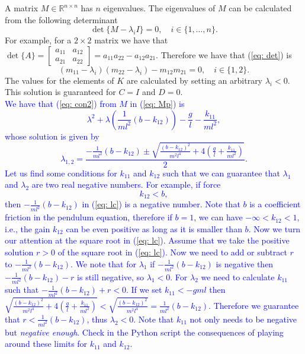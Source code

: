 A matrix $M\in\mathbb{R}^{n\times n}$ has $n$ eigenvalues. The eigenvalues of $M$ can be calculated from the following determinant
\begin{equation}
	\operatorname{det}\{M - \lambda_{i} I\} = 0, \quad i\in\{1,\dots,n\}. \label{eq: det}
\end{equation}
For example, for a $2 \times 2$ matrix we have that $\operatorname{det}\{A\} = \begin{bmatrix}a_{11} & a_{12} \\ a_{21} & a_{22}\end{bmatrix} = a_{11}a_{22} - a_{12}a_{21}$. Therefore we have that (\ref{eq: det}) is
\begin{equation}
	(m_{11} - \lambda_i) (m_{22} - \lambda_i) - m_{12}m_{21} = 0, \quad  i\in\{1,2\}. \label{eq: con2}
\end{equation}
The values for the elements of $K$ are calculated by setting an arbitrary $\lambda_i < 0$. This solution is guaranteed for $C = I$ and $D = 0$. \\
\textcolor{blue}{
	We have that (\ref{eq: con2}) from $M$ in (\ref{eq: Mp}) is
\begin{equation}
	\lambda^2 + \lambda\left(\frac{1}{ml^2}(b-k_{12})\right) - \frac{g}{l}-\frac{k_{11}}{ml^2}, \nonumber
\end{equation}
whose solution is given by
\begin{equation}
	\lambda_{1,2} = \frac{-\frac{1}{ml^2}(b-k_{12}) \pm \sqrt{\frac{(b-k_{12})^2}{m^2l^4}+4(\frac{g}{l}+\frac{k_{11}}{ml^2})}}{2}. \label{eq: lc}
\end{equation}
Let us find some conditions for $k_{11}$ and $k_{12}$ such that we can guarantee that $\lambda_1$ and $\lambda_2$ are two real negative numbers. For example, if force
\begin{equation}
	k_{12} < b,
\end{equation}
then $-\frac{1}{ml^2}(b-k_{12})$ in (\ref{eq: lc}) is a negative number. Note that $b$ is a coefficient friction in the pendulum equation, therefore if $b = 1$, we can have $-\infty < k_{12} < 1$, i.e., the gain $k_{12}$ can be even positive as long as it is smaller than $b$. Now we turn our attention at the square root in (\ref{eq: lc}). Assume that we take the positive solution $r>0$ of the square root in (\ref{eq: lc}). Now we need to add or subtract $r$ to $-\frac{1}{ml^2}(b-k_{12})$. We note that for $\lambda_1$ if $-\frac{1}{ml^2}(b-k_{12})$ is negative then $-\frac{1}{ml^2}(b-k_{12})- r$ is still negative, so $\lambda_1 < 0$. For $\lambda_2$ we need to calculate $k_{11}$ such that  $-\frac{1}{ml^2}(b-k_{12}) + r < 0$. If we set $k_{11} < -gml$ then $\sqrt{\frac{(b-k_{12})^2}{m^2l^4}+4(\frac{g}{l}+\frac{k_{11}}{ml^2})} < \sqrt{\frac{(b-k_{12})^2}{m^2l^4}} = \frac{1}{ml^2}(b-k_{12})$. Therefore we guarantee that $r < \frac{1}{ml^2}(b-k_{12})$, thus $\lambda_2 < 0$. Note that $k_{11}$ not only needs to be negative but \emph{negative enough}. Check in the Python script the consequences of playing around these limits for $k_{11}$ and $k_{12}$.
}

